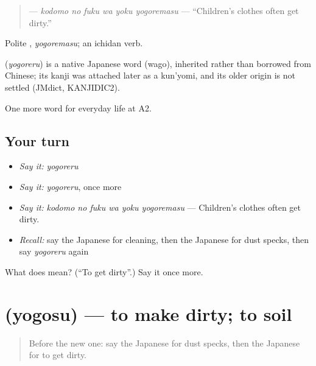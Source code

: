 \begin{quote}
\textbf{   } — \emph{kodomo no fuku wa yoku yogoremasu} — \textquotedblleft{}Children's clothes often get dirty.\textquotedblright{}
\end{quote}

Polite \textbf{}, \emph{yogoremasu}; an ichidan verb.

\begin{cousinweb}
\textbf{} (\emph{yogoreru}) is a native Japanese word (wago), inherited rather than borrowed from Chinese; its kanji was attached later as a kun'yomi, and its older origin is not settled (JMdict, KANJIDIC2).
\end{cousinweb}

\begin{grammarlens}[title={What you've built}]
One more word for everyday life at A2.
\end{grammarlens}

\subsection*{Your turn}
\begin{itemize}
\raggedright
  \item \emph{Say it:} \emph{yogoreru}
  \item \emph{Say it:} \emph{yogoreru}, once more
  \item \emph{Say it:} \emph{kodomo no fuku wa yoku yogoremasu} — Children's clothes often get dirty.
  \item \emph{Recall:} say the Japanese for cleaning, then the Japanese for dust specks, then say \emph{yogoreru} again
\end{itemize}

\begin{tcolorbox}[breakable,colback=teal!4,colframe=teal!35!black,title={Before you move on}]
What does  mean? (\textquotedblleft{}To get dirty\textquotedblright{}.) Say it once more.
\end{tcolorbox}
\section[\texorpdfstring{\ja{よごす} (yogosu)}{よごす (yogosu)}]{ (yogosu) — to make dirty; to soil}

\label{lesson:JA-C160-yogosu}



\begin{quote}
Before the new one: say the Japanese for dust specks, then the Japanese for to get dirty.
\end{quote}

